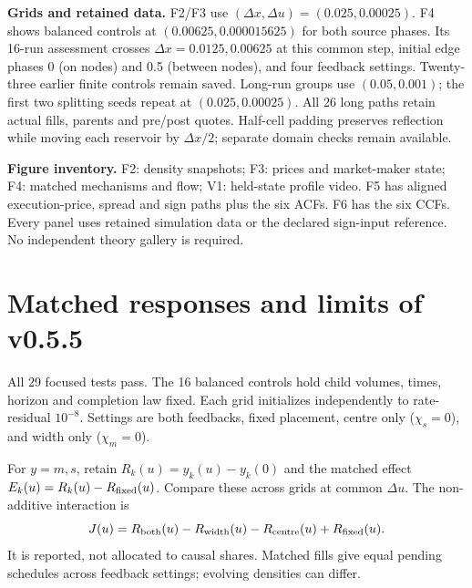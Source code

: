 \documentclass[11pt,a4paper]{article}
\newcommand{\du}{\Delta u}\newcommand{\dx}{\Delta x}
\begin{document}
\textbf{Grids and retained data.} F2/F3 use $(\dx,\du)=(0.025,0.00025)$.
F4 shows balanced controls at $(0.00625,0.000015625)$ for both source phases.
Its 16-run assessment crosses $\dx=0.0125,0.00625$ at this common step,
initial edge phases 0 (on nodes) and 0.5 (between nodes), and four feedback
settings. Twenty-three earlier finite controls
remain saved. Long-run groups use $(0.05,0.001)$; the first two splitting
seeds repeat at $(0.025,0.00025)$. All 26 long paths retain actual fills,
parents and pre/post quotes. Half-cell padding preserves reflection while
moving each reservoir by $\dx/2$; separate domain checks remain available.

\textbf{Figure inventory.} F2: density snapshots; F3: prices and market-maker
state; F4: matched mechanisms and flow; V1: held-state profile video.
F5 has aligned execution-price, spread and sign paths plus the six ACFs.
F6 has the six CCFs. Every panel uses retained simulation data or the
declared sign-input reference. No independent theory gallery is required.

\newpage
\section{Matched responses and limits of v0.5.5}
All 29 focused tests pass. The 16 balanced controls hold child volumes,
times, horizon and completion law fixed. Each grid initializes independently
to rate-residual $10^{-8}$. Settings are both feedbacks, fixed placement,
centre only ($\chi_s=0$), and width only ($\chi_m=0$).

For $y=m,s$, retain $R_k(u)=y_k(u)-y_k(0)$ and the matched effect
$E_k(u)=R_k(u)-R_{\rm fixed}(u)$. Compare these across grids at common $\du$.
The non-additive interaction is
\[
 J(u)=R_{\rm both}(u)-R_{\rm width}(u)-R_{\rm centre}(u)+R_{\rm fixed}(u).
\]
It is reported, not allocated to causal shares. Matched fills give equal
pending schedules across feedback settings; evolving densities can differ.
\end{document}
